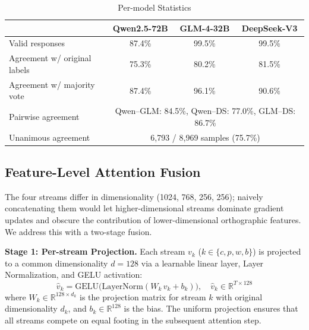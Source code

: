 ﻿\documentclass[12pt]{article}
\begin{document}
\begin{table}[htbp]
\centering
\caption{Per-model Statistics}
\label{tab:llm-stats}
\begin{tabular}{lccc}
\toprule
 & Qwen2.5-72B & GLM-4-32B & DeepSeek-V3 \\
\midrule
Valid responses & 87.4\% & 99.5\% & 99.5\% \\
Agreement w/ original labels & 75.3\% & 80.2\% & 81.5\% \\
Agreement w/ majority vote & 87.4\% & 96.1\% & 90.6\% \\
\midrule
Pairwise agreement & \multicolumn{3}{c}{Qwen--GLM: 84.5\%, Qwen--DS: 77.0\%, GLM--DS: 86.7\%} \\
Unanimous agreement & \multicolumn{3}{c}{6{,}793 / 8{,}969 samples (75.7\%)} \\
\bottomrule
\end{tabular}
\end{table}
\subsection{Feature-Level Attention Fusion}
\label{sec:attention-fusion}
The four streams differ in dimensionality (1024, 768, 256, 256); naively concatenating them would let higher-dimensional streams dominate gradient updates and obscure the contribution of lower-dimensional orthographic features. We address this with a two-stage fusion.

\textbf{Stage 1: Per-stream Projection.} Each stream $v_k$ ($k \in \{c, p, w, b\}$) is projected to a common dimensionality $d = 128$ via a learnable linear layer, Layer Normalization, and GELU activation:
\[
\hat{v}_k = \mathrm{GELU}\bigl(\mathrm{LayerNorm}(W_k \, v_k + b_k)\bigr), \quad \hat{v}_k \in \mathbb{R}^{T \times 128}
\]
where $W_k \in \mathbb{R}^{128 \times d_k}$ is the projection matrix for stream $k$ with original dimensionality $d_k$, and $b_k \in \mathbb{R}^{128}$ is the bias. The uniform projection ensures that all streams compete on equal footing in the subsequent attention step.
\end{document}
